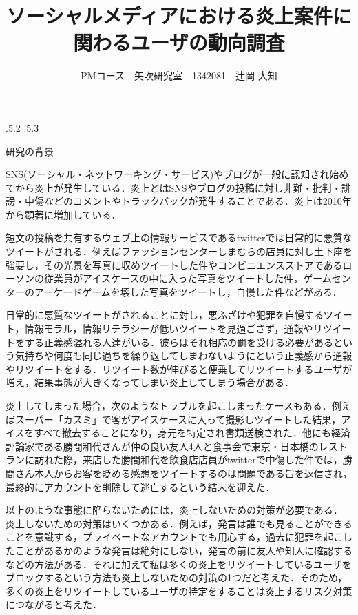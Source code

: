 \documentclass[uplatex]{jsarticle}
\title{\vspace{-14mm}ソーシャルメディアにおける炎上案件に関わるユーザの動向調査}
\author{PMコース　矢吹研究室　1342081　辻岡 大知}
\date{}%
\makeatletter
\renewcommand{\section}{%
    \if@slide\clearpage\fi
    \@startsection{section}{1}{\z@}%
    {\Cvs \@plus.5\Cdp \@minus.2\Cdp}%
    {.5\Cvs \@plus.3\Cdp}%
    {\normalfont\raggedright}}
\makeatother
\begin{document}
\maketitle





\section{研究の背景}

 SNS(ソーシャル・ネットワーキング・サービス)やブログが一般に認知され始めてから炎上が発生している．炎上とはSNSやブログの投稿に対し非難・批判・誹謗・中傷などのコメントやトラックバックが発生することである．炎上は2010年から顕著に増加している\cite{a}．

 短文の投稿を共有するウェブ上の情報サービスであるtwitterでは日常的に悪質なツイートがされる\cite{b}．例えばファッションセンターしまむらの店員に対し土下座を強要し，その光景を写真に収めツイートした件やコンビニエンスストアであるローソンの従業員がアイスケースの中に入った写真をツイートした件，ゲームセンターのアーケードゲームを壊した写真をツイートし，自慢した件などがある．

 日常的に悪質なツイートがされることに対し，悪ふざけや犯罪を自慢するツイート，情報モラル，情報リテラシーが低いツイートを見過ごさず，通報やリツイートをする正義感溢れる人達がいる．彼らはそれ相応の罰を受ける必要があるという気持ちや何度も同じ過ちを繰り返してしまわないようにという正義感から通報やリツイートをする．リツイート数が伸びると便乗してリツイートするユーザが増え，結果事態が大きくなってしまい炎上してしまう場合がある．
 
 炎上してしまった場合，次のようなトラブルを起こしまったケースもある．例えばスーパー「カスミ」で客がアイスケースに入って撮影しツイートした結果，アイスをすべて撤去することになり，身元を特定され書類送検された．他にも経済評論家である勝間和代さんが仲の良い友人4人と食事会で東京・日本橋のレストランに訪れた際，来店した勝間和代を飲食店店員がtwitterで中傷した件では，勝間さん本人からお客を貶める感想をツイートするのは問題である旨を返信され，最終的にアカウントを削除して逃亡するという結末を迎えた\cite{t}．

 以上のような事態に陥らないためには，炎上しないための対策が必要である． 炎上しないための対策はいくつかある．例えば，発言は誰でも見ることができることを意識する，プライベートなアカウントでも用心する，過去に犯罪を起こしたことがあるかのような発言は絶対にしない，発言の前に友人や知人に確認するなどの方法がある\cite{enjo}．それに加えて私は多くの炎上をリツイートしているユーザをブロックするという方法も炎上しないための対策の1つだと考えた．そのため，多くの炎上をリツイートしているユーザの特定をすることは炎上するリスク対策につながると考えた．
\end{document}
